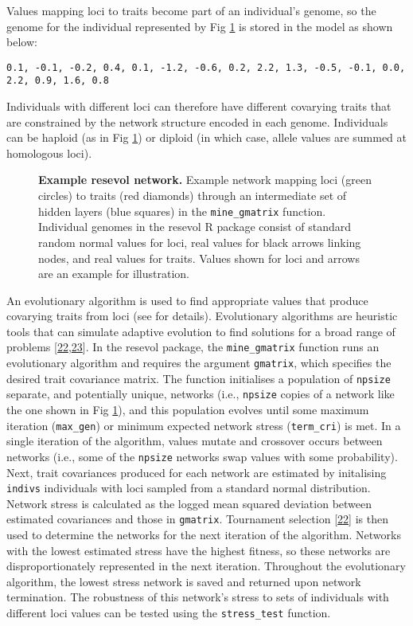 \documentclass[10pt,letterpaper]{article}
\begin{document}
Values mapping loci to traits become part of an individual's genome, so the genome for the individual represented by Fig \ref{fig:network} is stored in the model as shown below:

\begin{verbatim}
0.1, -0.1, -0.2, 0.4, 0.1, -1.2, -0.6, 0.2, 2.2, 1.3, -0.5, -0.1, 0.0, 
2.2, 0.9, 1.6, 0.8
\end{verbatim}

Individuals with different loci can therefore have different covarying traits that are constrained by the network structure encoded in each genome.
Individuals can be haploid (as in Fig \ref{fig:network}) or diploid (in which case, allele values are summed at homologous loci).

\begin{figure}[!h]
\caption{{\bf Example resevol network.}
Example network mapping loci (green circles) to traits (red diamonds) through an intermediate set of hidden layers (blue squares) in the \texttt{mine\_gmatrix} function. Individual genomes in the resevol R package consist of standard random normal values for loci, real values for black arrows linking nodes, and real values for traits. Values shown for loci and arrows are an example for illustration.}
\label{fig:network}
\end{figure}

An evolutionary algorithm is used to find appropriate values that produce covarying traits from loci (see  for details).
Evolutionary algorithms are heuristic tools that can simulate adaptive evolution to find solutions for a broad range of problems {[}\protect\hyperlink{ref-Hamblin2013}{22},\protect\hyperlink{ref-Duthie2018}{23}{]}.
In the resevol package, the \texttt{mine\_gmatrix} function runs an evolutionary algorithm and requires the argument \texttt{gmatrix}, which specifies the desired trait covariance matrix.
The function initialises a population of \texttt{npsize} separate, and potentially unique, networks (i.e., \texttt{npsize} copies of a network like the one shown in Fig \ref{fig:network}), and this population evolves until some maximum iteration (\texttt{max\_gen}) or minimum expected network stress (\texttt{term\_cri}) is met.
In a single iteration of the algorithm, values mutate and crossover occurs between networks (i.e., some of the \texttt{npsize} networks swap values with some probability).
Next, trait covariances produced for each network are estimated by initalising \texttt{indivs} individuals with loci sampled from a standard normal distribution.
Network stress is calculated as the logged mean squared deviation between estimated covariances and those in \texttt{gmatrix}.
Tournament selection {[}\protect\hyperlink{ref-Hamblin2013}{22}{]} is then used to determine the networks for the next iteration of the algorithm.
Networks with the lowest estimated stress have the highest fitness, so these networks are disproportionately represented in the next iteration.
Throughout the evolutionary algorithm, the lowest stress network is saved and returned upon network termination.
The robustness of this network's stress to sets of individuals with different loci values can be tested using the \texttt{stress\_test} function.
\end{document}
